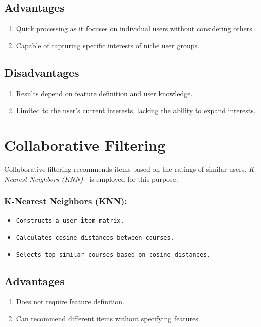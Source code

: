 \subsection{Advantages}
\begin{enumerate}
  \item \textsf{Quick processing as it focuses on individual users without considering others.}
  \item \textsf{Capable of capturing specific interests of niche user groups.}
\end{enumerate}

\subsection{Disadvantages}
\begin{enumerate}
  \item \textsf{Results depend on feature definition and user knowledge.}
  \item \textsf{Limited to the user's current interests, lacking the ability to expand interests.}
\end{enumerate}

\section{Collaborative Filtering}
Collaborative filtering recommends items based on the ratings of similar users. 
\textit{K-Nearest Neighbors (KNN)}~\cite{10.1007/978-3-030-66840-2_21} is employed for this purpose.

\subsubsection{K-Nearest Neighbors (KNN):} 

\begin{itemize}
  \item \texttt{Constructs a user-item matrix.}
  \item \texttt{Calculates cosine distances between courses.}
  \item \texttt{Selects top similar courses based on cosine distances.}
\end{itemize}
  
\subsection{Advantages}
\begin{enumerate}
  \item \textsf{Does not require feature definition.}
  \item \textsf{Can recommend different items without specifying features.}
\end{enumerate}

